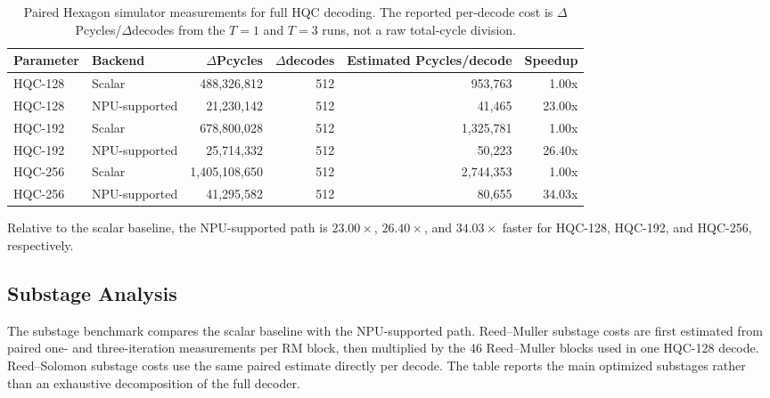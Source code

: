 \begin{table}[htbp]
\centering
\renewcommand{\arraystretch}{1.15}
\small
\begin{tabular}{|l|l|r|r|r|r|}
\hline
\textbf{Parameter} & \textbf{Backend} & \(\Delta\)\textbf{Pcycles} &
\(\Delta\)\textbf{decodes} & \textbf{Estimated Pcycles/decode} &
\textbf{Speedup} \\
\hline
HQC-128 & Scalar & 488,326,812 & 512 & 953,763 & 1.00x \\
\hline
HQC-128 & NPU-supported & 21,230,142 & 512 & 41,465 & 23.00x \\
\hline
HQC-192 & Scalar & 678,800,028 & 512 & 1,325,781 & 1.00x \\
\hline
HQC-192 & NPU-supported & 25,714,332 & 512 & 50,223 & 26.40x \\
\hline
HQC-256 & Scalar & 1,405,108,650 & 512 & 2,744,353 & 1.00x \\
\hline
HQC-256 & NPU-supported & 41,295,582 & 512 & 80,655 & 34.03x \\
\hline
\end{tabular}
\vspace{0.5em}
\caption{Paired Hexagon simulator measurements for full HQC decoding. The
reported per-decode cost is \(\Delta\)Pcycles/\(\Delta\)decodes from the
\(T=1\) and \(T=3\) runs, not a raw total-cycle division.}
\label{tab:sim-pcycles-full}
\end{table}

Relative to the scalar baseline, the NPU-supported path is \(23.00\times\),
\(26.40\times\), and \(34.03\times\) faster for HQC-128, HQC-192, and HQC-256,
respectively.

\subsection{Substage Analysis}

The substage benchmark compares the scalar baseline with the NPU-supported path.
Reed--Muller substage costs are first estimated from paired one- and
three-iteration measurements per RM block, then multiplied by the \(46\)
Reed--Muller blocks used in one HQC-128 decode. Reed--Solomon substage costs
use the same paired estimate directly per decode. The table reports the main
optimized substages rather than an exhaustive decomposition of the full decoder.

